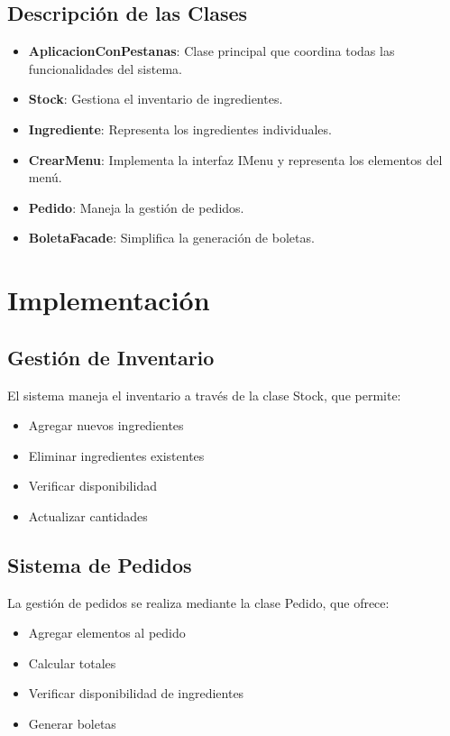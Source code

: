 \documentclass[12pt,letterpaper]{article}
\begin{document}
\subsection{Descripción de las Clases}
\begin{itemize}
    \item \textbf{AplicacionConPestanas}: Clase principal que coordina todas las funcionalidades del sistema.
    \item \textbf{Stock}: Gestiona el inventario de ingredientes.
    \item \textbf{Ingrediente}: Representa los ingredientes individuales.
    \item \textbf{CrearMenu}: Implementa la interfaz IMenu y representa los elementos del menú.
    \item \textbf{Pedido}: Maneja la gestión de pedidos.
    \item \textbf{BoletaFacade}: Simplifica la generación de boletas.
\end{itemize}

\section{Implementación}
\subsection{Gestión de Inventario}
El sistema maneja el inventario a través de la clase Stock, que permite:
\begin{itemize}
    \item Agregar nuevos ingredientes
    \item Eliminar ingredientes existentes
    \item Verificar disponibilidad
    \item Actualizar cantidades
\end{itemize}

\subsection{Sistema de Pedidos}
La gestión de pedidos se realiza mediante la clase Pedido, que ofrece:
\begin{itemize}
    \item Agregar elementos al pedido
    \item Calcular totales
    \item Verificar disponibilidad de ingredientes
    \item Generar boletas
\end{itemize}
\end{document}
